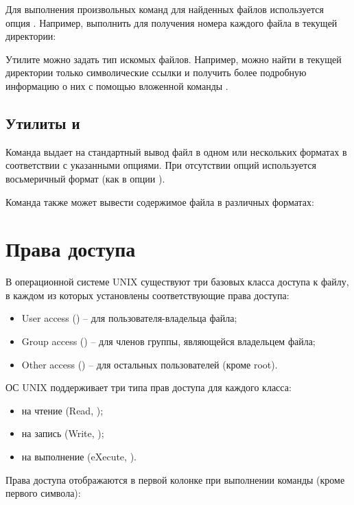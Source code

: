 Для выполнения произвольных команд для найденных файлов используется опция . Например, выполнить  для получения номера  каждого файла в текущей директории:


Утилите  можно задать тип искомых файлов. Например, можно найти в текущей директории только символические ссылки и получить более подробную информацию о них с помощью вложенной команды .


\subsection{Утилиты  и }

Команда  выдает на стандартный вывод файл в одном или нескольких форматах в соответствии с указанными опциями. При отсутствии опций используется восьмеричный формат (как в опции ).


Команда  также может вывести содержимое файла в различных форматах:


\section{Права доступа}

В операционной системе UNIX существуют три базовых класса доступа к файлу, в каждом из которых установлены соответствующие права доступа:
\begin{itemize}
	\item User access () -- для пользователя-владельца файла;
	\item Group access () -- для членов группы, являющейся владельцем файла;
	\item Other access () -- для остальных пользователей (кроме root).
\end{itemize}

ОС UNIX поддерживает три типа прав доступа для каждого класса: 
\begin{itemize}
	\item на чтение (Read, );
	\item на запись (Write, );
	\item на выполнение (eXecute, ).
\end{itemize}

Права доступа отображаются в первой колонке при выполнении команды  (кроме первого символа):


